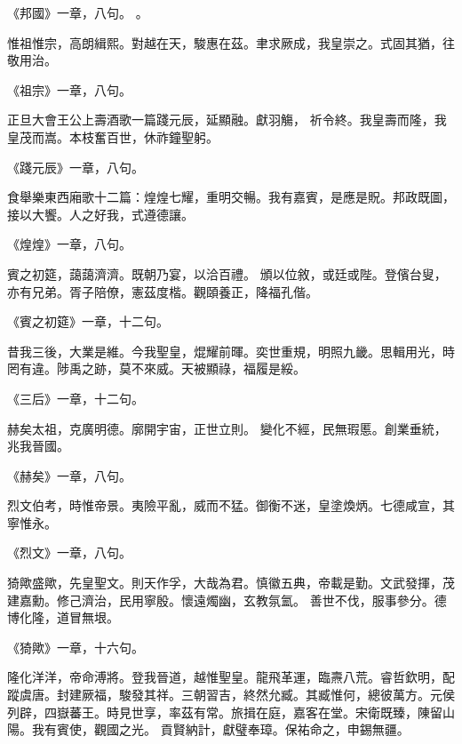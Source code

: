 \begin{pinyinscope}
《邦國》一章，八句。
 。



 惟祖惟宗，高朗緝熙。對越在天，駿惠在茲。聿求厥成，我皇崇之。式固其猶，往敬用治。


《祖宗》一章，八句。



 正旦大會王公上壽酒歌一篇踐元辰，延顯融。獻羽觴，
 祈令終。我皇壽而隆，我皇茂而嵩。本枝奮百世，休祚鐘聖躬。


《踐元辰》一章，八句。



 食舉樂東西廂歌十二篇：煌煌七耀，重明交暢。我有嘉賓，是應是貺。邦政既圖，接以大饗。人之好我，式遵德讓。


《煌煌》一章，八句。



 賓之初筵，藹藹濟濟。既朝乃宴，以洽百禮。
 頒以位敘，或廷或陛。登儐台叟，亦有兄弟。胥子陪僚，憲茲度楷。觀頤養正，降福孔偕。


《賓之初筵》一章，十二句。



 昔我三後，大業是維。今我聖皇，焜耀前暉。奕世重規，明照九畿。思輯用光，時罔有違。陟禹之跡，莫不來威。天被顯祿，福履是綏。


《三后》一章，十二句。



 赫矣太祖，克廣明德。廓開宇宙，正世立則。
 變化不經，民無瑕慝。創業垂統，兆我晉國。


《赫矣》一章，八句。



 烈文伯考，時惟帝景。夷險平亂，威而不猛。御衡不迷，皇塗煥炳。七德咸宣，其寧惟永。


《烈文》一章，八句。



 猗歟盛歟，先皇聖文。則天作孚，大哉為君。慎徽五典，帝載是勤。文武發揮，茂建嘉勳。修己濟治，民用寧殷。懷遠燭幽，玄教氛氳。
 善世不伐，服事參分。德博化隆，道冒無垠。


《猗歟》一章，十六句。



 隆化洋洋，帝命溥將。登我晉道，越惟聖皇。龍飛革運，臨燾八荒。睿哲欽明，配蹤虞唐。封建厥福，駿發其祥。三朝習吉，終然允臧。其臧惟何，總彼萬方。元侯列辟，四嶽蕃王。時見世享，率茲有常。旅揖在庭，嘉客在堂。宋衛既臻，陳留山陽。我有賓使，觀國之光。
 貢賢納計，獻璧奉璋。保祐命之，申錫無疆。



\end{pinyinscope}

